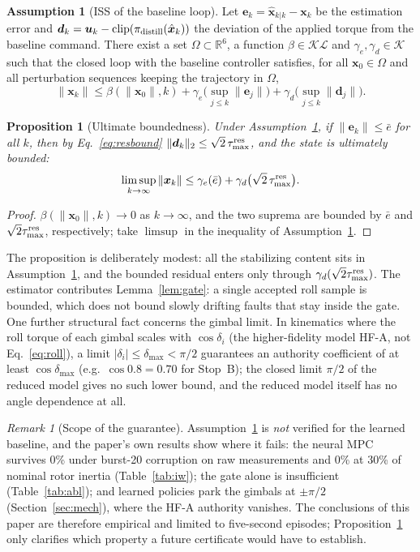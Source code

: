 \documentclass[preprint,12pt,authoryear=false]{elsarticle}
\theoremstyle{remark}\newtheorem{remark}{Remark}
\theoremstyle{plain}\newtheorem{proposition}{Proposition}\newtheorem{lemma}{Lemma}
\theoremstyle{definition}\newtheorem{assumption}{Assumption}
\begin{document}
\begin{assumption}[ISS of the baseline loop]\label{as:iss}
Let $\bm e_k=\hat{\bm x}_{k|k}-\bm x_k$ be the estimation error and $\bm d_k=\bm u_k-\mathrm{clip}(\pi_{\rm distill}(\hat{\bm x}_k))$ the deviation of the applied torque from the baseline command. There exist a set $\Omega\subset\mathbb R^6$, a function $\beta\in\mathcal{KL}$ and $\gamma_e,\gamma_d\in\mathcal K$ such that the closed loop with the baseline controller satisfies, for all $\bm x_0\in\Omega$ and all perturbation sequences keeping the trajectory in $\Omega$,
\[
\|\bm x_k\|\le\beta(\|\bm x_0\|,k)+\gamma_e\big(\sup_{j\le k}\|\bm e_j\|\big)+\gamma_d\big(\sup_{j\le k}\|\bm d_j\|\big).
\]
\end{assumption}

\begin{proposition}[Ultimate boundedness]\label{prop:ub}
Under Assumption~\ref{as:iss}, if $\|\bm e_k\|\le\bar e$ for all $k$, then by Eq.~\eqref{eq:resbound} $\|\bm d_k\|_2\le\sqrt2\,\tau^{\rm res}_{\max}$, and the state is ultimately bounded:
\[
\limsup_{k\to\infty}\|\bm x_k\|\le\gamma_e(\bar e)+\gamma_d\big(\sqrt2\,\tau^{\rm res}_{\max}\big).
\]
\end{proposition}
\begin{proof}
$\beta(\|\bm x_0\|,k)\to0$ as $k\to\infty$, and the two suprema are bounded by $\bar e$ and $\sqrt2\tau^{\rm res}_{\max}$, respectively; take $\limsup$ in the inequality of Assumption~\ref{as:iss}.
\end{proof}

The proposition is deliberately modest: all the stabilizing content sits in Assumption~\ref{as:iss}, and the bounded residual enters only through $\gamma_d(\sqrt2\tau^{\rm res}_{\max})$. The estimator contributes Lemma~\ref{lem:gate}: a single accepted roll sample is bounded, which does not bound slowly drifting faults that stay inside the gate. One further structural fact concerns the gimbal limit. In kinematics where the roll torque of each gimbal scales with $\cos\delta_i$ (the higher-fidelity model HF-A, not Eq.~\eqref{eq:roll}), a limit $|\delta_i|\le\delta_{\max}<\pi/2$ guarantees an authority coefficient of at least $\cos\delta_{\max}$ (e.g.\ $\cos0.8=0.70$ for Stop~B); the closed limit $\pi/2$ of the reduced model gives no such lower bound, and the reduced model itself has no angle dependence at all.

\begin{remark}[Scope of the guarantee]
Assumption~\ref{as:iss} is \emph{not} verified for the learned baseline, and the paper's own results show where it fails: the neural MPC survives 0\% under burst-20 corruption on raw measurements and 0\% at 30\% of nominal rotor inertia (Table~\ref{tab:iw}); the gate alone is insufficient (Table~\ref{tab:abl}); and learned policies park the gimbals at $\pm\pi/2$ (Section~\ref{sec:mech}), where the HF-A authority vanishes. The conclusions of this paper are therefore empirical and limited to five-second episodes; Proposition~\ref{prop:ub} only clarifies which property a future certificate would have to establish.
\end{remark}
\end{document}
